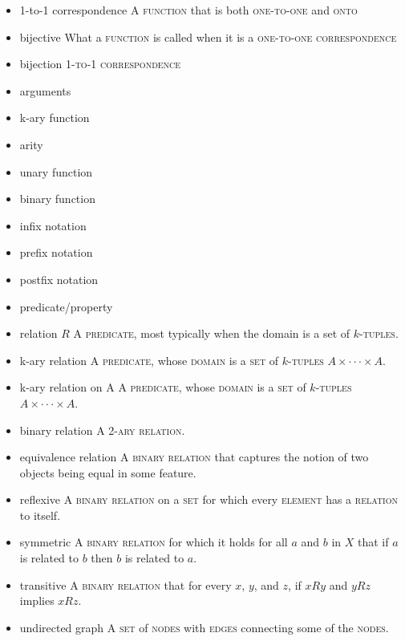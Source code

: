 \documentclass{article}
\newcommand{\term}[1]{\textsc{#1}}
\begin{document}
\bigskip \indent
\begin{itemize}
\item 1-to-1 correspondence
   \subitem A \term{function} that is both \term{one-to-one} and \term{onto}
\item bijective
   \subitem  What a \term{function} is called when it is a \term{one-to-one correspondence}
\item bijection
   \subitem \term{1-to-1 correspondence}
\item arguments

\item k-ary function

\item arity

\item unary function

\item binary function

\item infix notation

\item prefix notation

\item postfix notation

\item predicate/property

\end{itemize}

\bigskip \indent
\begin{itemize}
\item relation $R$
  \subitem A \term{predicate}, most typically when the domain is a set of \term{$k$-tuples}.
\item k-ary relation
  \subitem A \term{predicate}, whose \term{domain} is a \term{set} of \term{$k$-tuples} $A \times \cdot \cdot \cdot \times A$.
\item k-ary relation on A
  \subitem A \term{predicate}, whose \term{domain} is a \term{set} of \term{$k$-tuples} $A \times \cdot \cdot \cdot \times A$.
\item binary relation
  \subitem A \term{2-ary} \term{relation}.
\item equivalence relation
  \subitem A \term{binary relation} that captures the notion of two objects being equal in some feature.
\item reflexive
  \subitem A \term{binary relation} on a \term{set} for which every \term{element} has a \term{relation} to itself.
\item symmetric
  \subitem A \term{binary relation} for which it holds for all $a$ and $b$ in $X$ that if $a$ is related to $b$ then $b$ is related to $a$.
\item transitive
  \subitem A \term{binary relation} that for every $x$, $y$, and $z$, if $xRy$ and $yRz$ implies $xRz$.
\item undirected graph
  \subitem A \term{set} of \term{nodes} with \term{edges} connecting some of the \term{nodes}.
\end{itemize}
\end{document}
